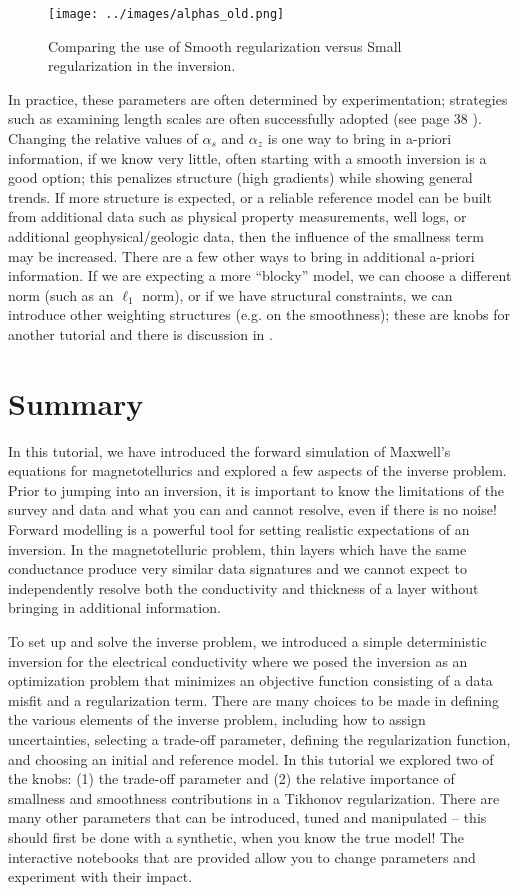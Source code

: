 \documentclass[11pt,oneside]{article}
\begin{document}
\begin{figure}[htb!]
    \centering
    \texttt{[image: ../images/alphas\_old.png]}
\caption{Comparing the use of Smooth regularization versus Small regularization in the inversion.}
\label{fig:alphas}
\end{figure}


In practice, these parameters are often determined by experimentation; strategies such as examining length scales are often successfully adopted (see page 38 \cite{OldenburgTutorial}). Changing the relative values of $\alpha_s$ and $\alpha_z$ is one way to bring in a-priori information, if we know very little, often starting with a smooth inversion is a good option; this penalizes structure (high gradients) while showing general trends. If more structure is expected, or a reliable reference model can be built from additional data such as physical property measurements, well logs, or additional geophysical/geologic data, then the influence of the smallness term may be increased. There are a few other ways to bring in additional a-priori information. If we are expecting a more ``blocky'' model, we can choose a different norm (such as an $\ell_1$ norm), or if we have structural constraints, we can introduce other weighting structures (e.g. on the smoothness); these are knobs for another tutorial and there is discussion in \cite{OldenburgTutorial}.

\section{Summary}
In this tutorial, we have introduced the forward simulation of Maxwell’s equations for magnetotellurics and explored a few aspects of the inverse problem. Prior to jumping into an inversion, it is important to know the limitations of the survey and data and what you can and cannot resolve, even if there is no noise! Forward modelling is a powerful tool for setting realistic expectations of an inversion. In the magnetotelluric problem, thin layers which have the same conductance produce very similar data signatures and we cannot expect to independently resolve both the conductivity and thickness of a layer without bringing in additional information.

To set up and solve the inverse problem, we introduced a simple deterministic inversion for the electrical conductivity where we posed the inversion as an optimization problem that minimizes an objective function consisting of a data misfit and a regularization term. There are many choices to be made in defining the various elements of the inverse problem, including how to assign uncertainties, selecting a trade-off parameter, defining the regularization function, and choosing an initial and reference model. In this tutorial we explored two of the knobs: (1) the trade-off parameter and (2) the relative importance of smallness and smoothness contributions in a Tikhonov regularization. There are many other parameters that can be introduced, tuned and manipulated -- this should first be done with a synthetic, when you know the true model! The interactive notebooks that are provided allow you to change parameters and experiment with their impact.

\clearpage

\end{document}
